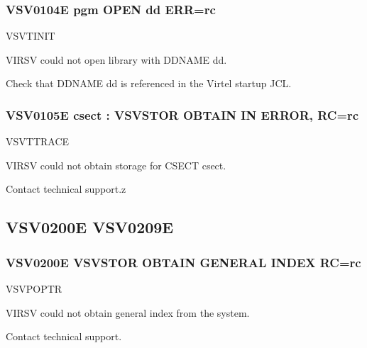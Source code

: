 \documentclass[letterpaper,10pt,english]{sphinxmanual}
\begin{document}
\subsubsection{VSV0104E pgm OPEN dd ERR=rc}
\label{\detokenize{messages:vsv0104e-pgm-open-dd-err-rc}}\begin{description}
\sphinxAtStartPar
VSVTINIT

\sphinxAtStartPar
VIRSV could not open library with DDNAME dd.

\sphinxAtStartPar
Check that DDNAME dd is referenced in the Virtel startup JCL.

\end{description}


\subsubsection{VSV0105E csect : VSVSTOR OBTAIN IN ERROR, RC=rc}
\label{\detokenize{messages:vsv0105e-csect-vsvstor-obtain-in-error-rc-rc}}\begin{description}
\sphinxAtStartPar
VSVTTRACE

\sphinxAtStartPar
VIRSV could not obtain storage for CSECT csect.

\sphinxAtStartPar
Contact technical support.z

\end{description}


\subsection{VSV0200E \sphinxhyphen{} VSV0209E}
\label{\detokenize{messages:vsv0200e-vsv0209e}}

\subsubsection{VSV0200E VSVSTOR OBTAIN GENERAL INDEX RC=rc}
\label{\detokenize{messages:vsv0200e-vsvstor-obtain-general-index-rc-rc}}\begin{description}
\sphinxAtStartPar
VSVPOPTR

\sphinxAtStartPar
VIRSV could not obtain general index from the system.

\sphinxAtStartPar
Contact technical support.

\end{description}
\end{document}
